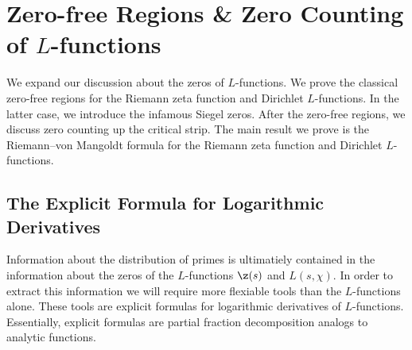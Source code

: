 \chapter{Zero-free Regions \& Zero Counting of \texorpdfstring{$L$}{L}-functions}
  We expand our discussion about the zeros of $L$-functions. We prove the classical zero-free regions for the Riemann zeta function and Dirichlet $L$-functions. In the latter case, we introduce the infamous Siegel zeros. After the zero-free regions, we discuss zero counting up the critical strip. The main result we prove is the Riemann–von Mangoldt formula for the Riemann zeta function and Dirichlet $L$-functions.
  \section{The Explicit Formula for Logarithmic Derivatives}
    Information about the distribution of primes is ultimatiely contained in the information about the zeros of the $L$-functions $\z(s)$ and $L(s,\chi)$. In order to extract this information we will require more flexiable tools than the $L$-functions alone. These tools are explicit formulas for logarithmic derivatives of $L$-functions. Essentially, explicit formulas are partial fraction decomposition analogs to analytic functions. 
